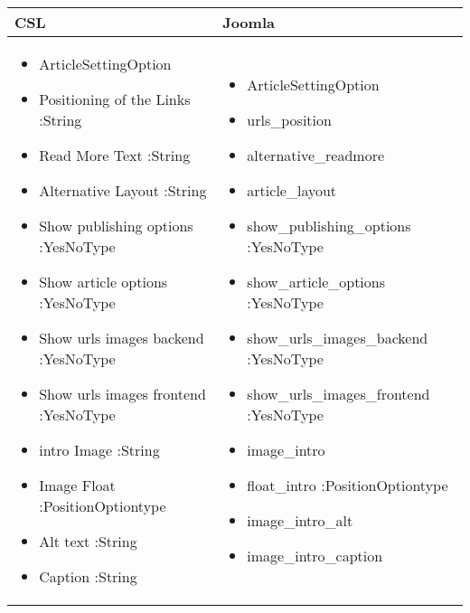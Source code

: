 \begin{minipage}{0.78\textwidth}
\begin{tabular}{|p{} | p{}|}
\hline
\textbf{CSL} & \textbf{Joomla} \\ 
\hline
\begin{itemize}
\item ArticleSettingOption
\item Positioning of the Links :String
\item Read More Text :String
\item Alternative Layout :String
\item Show publishing options :YesNoType
\item Show article options :YesNoType
\item Show urls images backend :YesNoType
\item Show urls images frontend :YesNoType
\item intro Image :String
\item Image Float :PositionOptiontype
\item Alt text :String
\item Caption :String
\end{itemize}
 & 
\begin{itemize}
\item ArticleSettingOption 
\item urls\_position 
\item alternative\_readmore 
\item article\_layout
\item show\_publishing\_options :YesNoType
\item show\_article\_options :YesNoType
\item show\_urls\_images\_backend :YesNoType	 
\item show\_urls\_images\_frontend :YesNoType
\item image\_intro 
\item float\_intro :PositionOptiontype
\item image\_intro\_alt 
\item image\_intro\_caption 
\end{itemize}
\\
\hline
\end{tabular}
\end{minipage}


